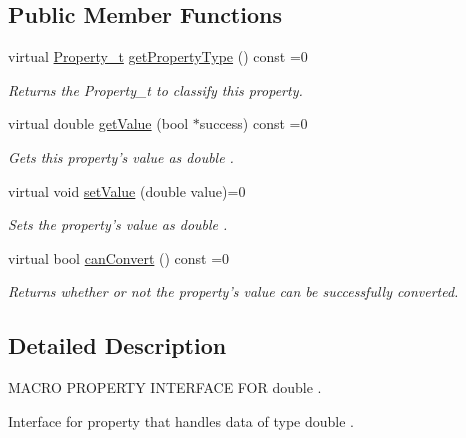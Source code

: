 \subsection*{Public Member Functions}
\begin{DoxyCompactItemize}
\item 
virtual \hyperlink{group___property_classes_ga38f1ccddda12c7cb50b868c9f789ee37}{Property\-\_\-t} \hyperlink{class_i_double_property_af14b72afdd37a35b626a71caa7ada8b4}{get\-Property\-Type} () const =0
\begin{DoxyCompactList}\small\item\em Returns the Property\-\_\-t to classify this property. \end{DoxyCompactList}\item 
virtual double \hyperlink{class_i_double_property_af9143d685793a22249eb50b2515260ac}{get\-Value} (bool $\ast$success) const =0
\begin{DoxyCompactList}\small\item\em Gets this property's value as double . \end{DoxyCompactList}\item 
virtual void \hyperlink{class_i_double_property_a900dcb23ea5981475417e3cdfee001e3}{set\-Value} (double value)=0
\begin{DoxyCompactList}\small\item\em Sets the property's value as double . \end{DoxyCompactList}\item 
virtual bool \hyperlink{class_i_double_property_afe5368913e955ec08c2797521d43d24a}{can\-Convert} () const =0
\begin{DoxyCompactList}\small\item\em Returns whether or not the property's value can be successfully converted. \end{DoxyCompactList}\end{DoxyCompactItemize}


\subsection{Detailed Description}
M\-A\-C\-R\-O P\-R\-O\-P\-E\-R\-T\-Y I\-N\-T\-E\-R\-F\-A\-C\-E F\-O\-R double . 

Interface for property that handles data of type double . 

